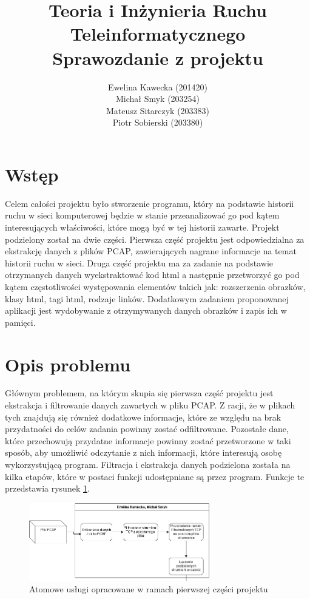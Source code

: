 \documentclass[12pt]{article}
\title{Teoria i Inżynieria Ruchu Teleinformatycznego \\ Sprawozdanie z projektu}
\author{Ewelina Kawecka (201420) \\ Michał Smyk (203254) \\ Mateusz Sitarczyk (203383) \\ Piotr Sobierski (203380)}
\begin{document}
\maketitle
\thispagestyle{empty}
\clearpage
\setcounter{page}{1}

\section{Wstęp}
Celem całości projektu było stworzenie programu, który na podstawie historii ruchu w sieci komputerowej będzie w stanie przeanalizować go pod kątem interesujących właściwości, które mogą być w tej historii zawarte. Projekt podzielony został na dwie części. Pierwsza część projektu jest odpowiedzialna za ekstrakcję danych z plików PCAP, zawierających nagrane informacje na temat historii ruchu w sieci. Druga część projektu ma za zadanie na podstawie otrzymanych danych wyekstraktować kod html a następnie przetworzyć go pod kątem częstotliwości występowania elementów takich jak: rozszerzenia obrazków, klasy html, tagi html, rodzaje linków. Dodatkowym zadaniem proponowanej aplikacji jest wydobywanie z otrzymywanych danych obrazków i zapis ich w pamięci. 

\section{Opis problemu}
Głównym problemem, na którym skupia się pierwsza część projektu jest ekstrakcja i filtrowanie danych zawartych w pliku PCAP. Z racji, że w plikach tych znajdują się również dodatkowe informacje, które ze względu na brak przydatności do celów zadania powinny zostać odfiltrowane. Pozostałe dane, które przechowują przydatne informacje powinny zostać przetworzone w taki sposób, aby umożliwić odczytanie z nich informacji, które interesują osobę wykorzystującą program. Filtracja i ekstrakcja danych podzielona została na kilka etapów, które w postaci funkcji udostępniane są przez program. Funkcje te przedstawia rysunek \ref{img:funkcje}.

\begin{figure}[h]
\centering
\caption{Atomowe usługi opracowane w ramach pierwszej części projektu}
\label{img:funkcje}
\includegraphics[width=0.7\textwidth]{Wykres.png}
\end{figure}
\end{document}

